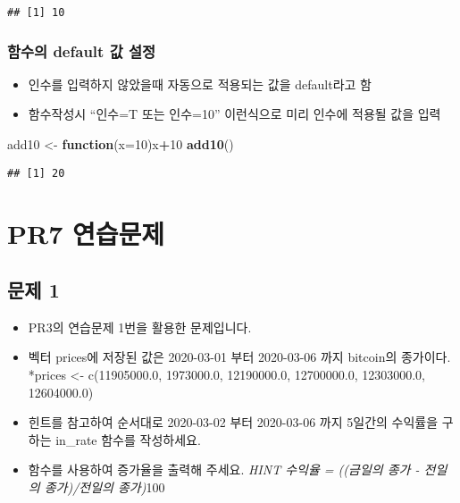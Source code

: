 \documentclass[
]{article}
\newenvironment{Shaded}{\begin{snugshade}}{\end{snugshade}}
\newcommand{\ControlFlowTok}[1]{\textcolor[rgb]{0.13,0.29,0.53}{\textbf{#1}}}
\newcommand{\DataTypeTok}[1]{\textcolor[rgb]{0.13,0.29,0.53}{#1}}
\newcommand{\DecValTok}[1]{\textcolor[rgb]{0.00,0.00,0.81}{#1}}
\newcommand{\KeywordTok}[1]{\textcolor[rgb]{0.13,0.29,0.53}{\textbf{#1}}}
\newcommand{\NormalTok}[1]{#1}
\newcommand{\OperatorTok}[1]{\textcolor[rgb]{0.81,0.36,0.00}{\textbf{#1}}}
\newcommand{\StringTok}[1]{\textcolor[rgb]{0.31,0.60,0.02}{#1}}
\providecommand{\tightlist}{%
  \setlength{\itemsep}{0pt}\setlength{\parskip}{0pt}}
\begin{document}
\begin{verbatim}
## [1] 10
\end{verbatim}

\hypertarget{uxd568uxc218uxc758-default-uxac12-uxc124uxc815}{%
\subsubsection{함수의 default 값
설정}\label{uxd568uxc218uxc758-default-uxac12-uxc124uxc815}}

\begin{itemize}
\tightlist
\item
  인수를 입력하지 않았을때 자동으로 적용되는 값을 default라고 함
\item
  함수작성시 ``인수=T 또는 인수=10'' 이런식으로 미리 인수에 적용될 값을
  입력
\end{itemize}

\begin{Shaded}
\begin{Highlighting}[]
\NormalTok{add10 <-}\StringTok{ }\ControlFlowTok{function}\NormalTok{(}\DataTypeTok{x=}\DecValTok{10}\NormalTok{)x}\OperatorTok{+}\DecValTok{10}
\KeywordTok{add10}\NormalTok{()}
\end{Highlighting}
\end{Shaded}

\begin{verbatim}
## [1] 20
\end{verbatim}

\hypertarget{pr7-uxc5f0uxc2b5uxbb38uxc81c}{%
\section{PR7 연습문제}\label{pr7-uxc5f0uxc2b5uxbb38uxc81c}}

\hypertarget{uxbb38uxc81c-1}{%
\subsection{문제 1}\label{uxbb38uxc81c-1}}

\begin{itemize}
\tightlist
\item
  PR3의 연습문제 1번을 활용한 문제입니다.
\item
  벡터 prices에 저장된 값은 2020-03-01 부터 2020-03-06 까지 bitcoin의
  종가이다. *prices \textless- c(11905000.0, 1973000.0, 12190000.0,
  12700000.0, 12303000.0, 12604000.0)
\item
  힌트를 참고하여 순서대로 2020-03-02 부터 2020-03-06 까지 5일간의
  수익률을 구하는 in\_rate 함수를 작성하세요.
\item
  함수를 사용하여 증가율을 출력해 주세요. \emph{HINT 수익율 = ((금일의
  종가 - 전일의 종가)/전일의 종가)}100
\end{itemize}
\end{document}
